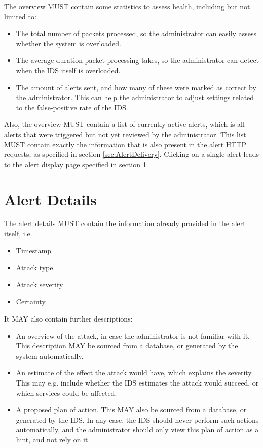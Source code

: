 \documentclass[oneside, english]{reports/assets/sdqtechreport}
\begin{document}
The overview MUST contain some statistics to assess health, including but not
limited to:
\begin{itemize}
	\item The total number of packets processed, so the administrator can easily
	assess whether the system is overloaded.
	\item The average duration packet processing takes, so the administrator can
	detect when the IDS itself is overloaded.
	\item The amount of alerts sent, and how many of these were marked as correct
	by the administrator. This can help the administrator to adjust settings
	related to the false-positive rate of the IDS.
\end{itemize}

Also, the overview MUST contain a list of currently active alerts, which is all
alerts that were triggered but not yet reviewed by the administrator. This list
MUST contain exactly the information that is also present in the alert HTTP
requests, as specified in section \ref{sec:AlertDelivery}. Clicking on a single
alert leads to the alert display page specified in section
\ref{sec:UserInterfaceAlertDetails}.

\section{Alert Details}
\label{sec:UserInterfaceAlertDetails}

The alert details MUST contain the information already provided in the alert
itself, i.e.
\begin{itemize}
	\item Timestamp
	\item Attack type
	\item Attack severity
	\item Certainty
\end{itemize}

It MAY also contain further descriptions:
\begin{itemize}
	\item An overview of the attack, in case the administrator is not familiar
	with it. This description MAY be sourced from a database, or generated by the
	system automatically.
	\item An estimate of the effect the attack would have, which explains the
	severity. This may e.g. include whether the IDS estimates the attack would
	succeed, or which services could be affected.
	\item A proposed plan of action. This MAY also be sourced from a database, or
	generated by the IDS. In any case, the IDS should never perform such actions
	automatically, and the administrator should only view this plan of action as a
	hint, and not rely on it.
\end{itemize}
\end{document}
